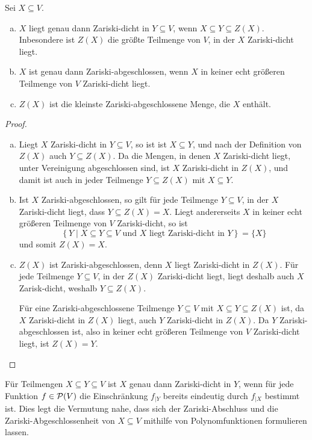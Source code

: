 \documentclass[a4paper,10pt]{article}
\begin{document}
\begin{lem}\label{lem: erste Aussagen über Zariski-Abschluss}
 Sei $X \subseteq V$.
 \begin{enumerate}[a)]
  \item
  $X$ liegt genau dann Zariski-dicht in $Y \subseteq V$, wenn $X \subseteq Y \subseteq Z(X)$. Inbesondere ist $Z(X)$ die größte Teilmenge von $V$, in der $X$ Zariski-dicht liegt.
  \item
  $X$ ist genau dann Zariski-abgeschlossen, wenn $X$ in keiner echt größeren Teilmenge von $V$ Zariski-dicht liegt.
  \item
  $Z(X)$ ist die kleinste Zariski-abgeschlossene Menge, die $X$ enthält. 
 \end{enumerate}
\end{lem}
\begin{proof}
 \begin{enumerate}[a)]
  \item
  Liegt $X$ Zariski-dicht in $Y \subseteq V$, so ist ist $X \subseteq Y$, und nach der Definition von $Z(X)$ auch $Y \subseteq Z(X)$. Da die Mengen, in denen $X$ Zariski-dicht liegt, unter Vereinigung abgeschlossen sind, ist $X$ Zariski-dicht in $Z(X)$, und damit ist auch in jeder Teilmenge $Y \subseteq Z(X)$ mit $X \subseteq Y$.
  \item
  Ist $X$ Zariski-abgeschlossen, so gilt für jede Teilmenge $Y \subseteq V$, in der $X$ Zariski-dicht liegt, dass $Y \subseteq Z(X) = X$. Liegt andererseits $X$ in keiner echt größeren Teilmenge von $V$ Zariski-dicht, so ist
  \[
   \left\{ Y \mid X \subseteq Y \subseteq V \text{ und $X$ liegt Zariski-dicht in $Y$} \right\} = \{X\} 
  \]
  und somit $Z(X) = X$.
  \item
  $Z(X)$ ist Zariski-abgeschlossen, denn $X$ liegt Zariski-dicht in $Z(X)$. Für jede Teilmenge $Y \subseteq V$, in der $Z(X)$ Zariski-dicht liegt, liegt deshalb auch $X$ Zarisk-dicht, weshalb $Y \subseteq Z(X)$.
  
  Für eine Zariski-abgeschlossene Teilmenge $Y \subseteq V$ mit $X \subseteq Y \subseteq Z(X)$ ist, da $X$ Zariski-dicht in $Z(X)$ liegt, auch $Y$ Zariski-dicht in $Z(X)$. Da $Y$ Zariski-abgeschlossen ist, also in keiner echt größeren Teilmenge von $V$ Zariski-dicht liegt, ist $Z(X) = Y$. \qedhere
 \end{enumerate}
\end{proof}


Für Teilmengen $X \subseteq Y \subseteq V$ ist $X$ genau dann Zariski-dicht in $Y$, wenn für jede Funktion $f \in \mathcal{P}(V)$ die Einschränkung $f_{|Y}$ bereits eindeutig durch $f_{|X}$ bestimmt ist. Dies legt die Vermutung nahe, dass sich der Zariski-Abschluss und die Zariski-Abgeschlossenheit von $X \subseteq V$ mithilfe von Polynomfunktionen formulieren lassen.
\end{document}
